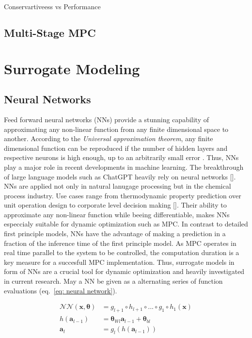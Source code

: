 Conservartiveess vs Performance

\section{Multi-Stage MPC}








\chapter{Surrogate Modeling}

\section{Neural Networks}

Feed forward neural networks (NNs) provide a stunning capability of approximating any non-linear function from any finite dimensional
space to another. According to the \emph{Universal approximation theorem}, any finite dimensional function can be reproduced if the number of hidden
layers and respective neurons is high enough, up to an arbitrarily small error \cite{hornik1990}. Thus, NNs play a major role in
recent developments in machine learning. The breakthrough of large language models such as ChatGPT heavily rely on neural
networks [\cite{vaswani2023}]. NNs are applied not only in natural lanugage processing but in the chemical process industry.
Use cases range from thermodynamic property prediction over unit operation design to corporate level decision making [\cite{mcbride2019}].
Their ability to approximate any non-linear function while beeing differentiable, makes NNs especcialy suitable for dynamic optimization
such as MPC. In contrast to detailed first principle models, NNs have the advantage of making a prediction in a fraction of the inference time
of the first principle model. As MPC operates in real time parallel to the system to be controlled, the computation duration is a key measure
for a succesfull MPC implementation. Thus, surrogate models in form of NNs are a crucial tool for dynamic optimization and heavily investigated
in current research. May a NN be given as a alternating series of function evaluations (eq.~\ref{eq: neural network}).

\begin{equation}
    \label{eq: neural network}
    \begin{aligned}
        \mathcal{NN}(\bm{x, \bm{\theta}}) &= g_{l+1} \circ h_{l+1} \circ ... \circ g_1 \circ h_1(\bm{x})
        \\
        h(\bm{a}_{l-1}) &= \bm{\theta}_{Wl}\bm{a}_{l-1} + \bm{\theta}_{bl}
        \\
        \bm{a}_{l} &= g_l(h(\bm{a}_{l-1}))
    \end{aligned}
\end{equation}

